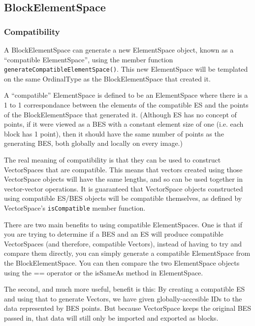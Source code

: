 \documentclass[10pt,relax]{TpetraDesign}
\begin{document}
%
\subsection{BlockElementSpace}

\subsubsection*{Compatibility}
A BlockElementSpace can generate a new ElementSpace object, known as a ``compatible ElementSpace'', using the member function \texttt{generateCompatibleElementSpace()}. This new ElementSpace will be templated on the same OrdinalType as the BlockElementSpace that created it.

A ``compatible'' ElementSpace is defined to be an ElementSpace where there is a 1 to 1 correspondance between the elements of the compatible ES and the points of the BlockElementSpace that generated it. (Although ES has no concept of points, if it were viewed as a BES with a constant element size of one (i.e. each block has 1 point), then it should have the same number of points as the generating BES, both globally and locally on every image.)

The real meaning of compatibility is that they can be used to construct VectorSpaces that are compatible. This means that vectors created using those VectorSpace objects will have the same lengths, and so can be used together in vector-vector operations. It is guaranteed that VectorSpace objects constructed using compatible ES/BES objects will be compatible themselves, as defined by VectorSpace's \texttt{isCompatible} member function.


There are two main benefits to using compatible ElementSpaces. One is that if you are trying to determine if a BES and an ES will produce compatible VectorSpaces (and therefore, compatible Vectors), instead of having to try and compare them directly, you can simply generate a compatible ElementSpace from the BlockElementSpace. You can then compare the two ElementSpace objects using the == operator or the isSameAs method in ElementSpace.

The second, and much more useful, benefit is this: By creating a compatible ES and using that to generate Vectors, we have given globally-accesible IDs to the data represented by BES points. But because VectorSpace keeps the original BES passed in, that data will still only be imported and exported as blocks.
\end{document}
